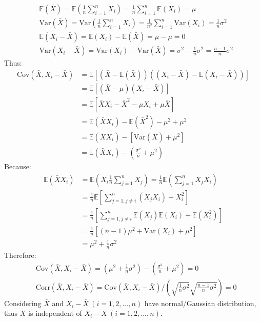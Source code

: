 \documentclass[twoside]{homework}
\begin{document}
\begin{equation}
\begin{aligned}
    &\mathbb{E}(\bar{X}) = \mathbb{E} (\frac{1}{n} \sum_{i=1}^n X_i) = \frac{1}{n} \sum_{i=1}^n \mathbb{E}(X_i)= \mu \\
    &\mathrm{Var}(\bar{X}) = \mathrm{Var} (\frac{1}{n} \sum_{i=1}^n X_i) = \frac{1}{n^2} \sum_{i=1}^n \mathrm{Var}(X_i) = \frac{1}{n} \sigma ^2\\
    &\mathbb{E}(X_i - \bar{X}) = \mathbb{E}(X_i) - \mathbb{E}(\bar{X}) = \mu - \mu = 0\\
    &\mathrm{Var}(X_i - \bar{X}) = \mathrm{Var}(X_i) - \mathrm{Var}(\bar{X}) = \sigma^2 - \frac{1}{n} \sigma ^2 = \frac{n-1}{n} \sigma ^2
\end{aligned}
\end{equation}
Thus:
\begin{equation}
\begin{aligned}
\mathrm{Cov}(\bar{X}, X_i - \bar{X})&=\mathbb{E}[(\bar{X}-\mathbb{E}(\bar{X}))((X_i - \bar{X})-\mathbb{E}(X_i - \bar{X}))]\\
&=\mathbb{E}[(\bar{X}-\mu)(X_i - \bar{X})]\\
&=\mathbb{E}[\bar{X}X_i-\bar{X}^2-\mu X_i+\mu \bar{X}]\\
&=\mathbb{E}(\bar{X}X_i)-\mathbb{E}(\bar{X}^2)-\mu^2+\mu^2\\
&=\mathbb{E}(\bar{X}X_i)-[\mathrm{Var}(\bar{X})+\mu^2]\\
&=\mathbb{E}(\bar{X}X_i)-(\frac{\sigma^2}{n}+\mu^2)
\end{aligned}
\end{equation}
Because:
\begin{equation}
\begin{aligned}
\mathbb{E}(\bar{X}X_i) &= \mathbb{E}(X_i \frac{1}{n} \sum_{j=1}^{n} X_j ) = \frac{1}{n} \mathbb{E} (\sum_{j=1}^{n} X_j X_i)\\
&= \frac{1}{n} \mathbb{E} [\sum_{j=1,j\neq i}^{n} (X_j X_i) + X_i^2]\\
&= \frac{1}{n} [\sum_{j=1,j\neq i}^{n} \mathbb{E}(X_j)\mathbb{E}(X_i) + \mathbb{E}(X_i^2)]\\
&= \frac{1}{n} [(n-1)\mu^2+\mathrm{Var}(X_i)+\mu^2]\\
&= \mu^2 + \frac{1}{n} \sigma^2
\end{aligned}
\end{equation}
Therefore:
\begin{equation}
\begin{aligned}
&\mathrm{Cov}(\bar{X}, X_i - \bar{X}) = (\mu^2 + \frac{1}{n} \sigma^2) - (\frac{\sigma^2}{n}+\mu^2) = 0\\
&\mathrm{Corr}(\bar{X}, X_i - \bar{X}) = \mathrm{Cov}(\bar{X}, X_i - \bar{X})/(\sqrt{\frac{1}{n} \sigma ^2}\sqrt{\frac{n-1}{n} \sigma ^2}) = 0
\end{aligned}
\end{equation}
Considering $\bar{X}$ and $X_i-\bar{X}\  (i=1,2,...,n)$ have normal/Gaussian distribution, thus $\bar{X}$ is independent of $X_i-\bar{X}\  (i=1,2,...,n)$.
\end{document}
